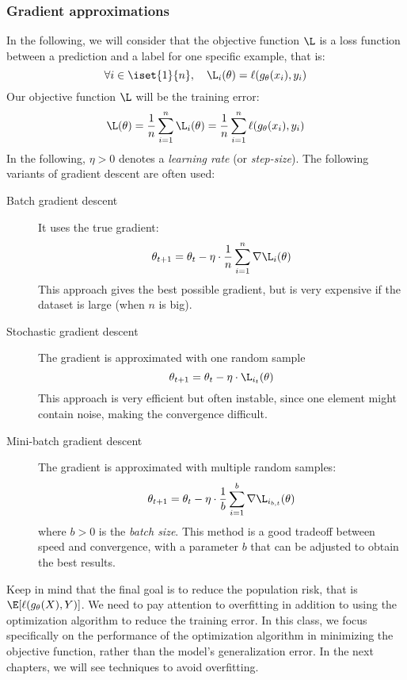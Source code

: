 \subsubsection{Gradient approximations}
In the following, we will consider that the objective function $\L$ is a loss function between a prediction and a label for one specific example, that is:
\begin{equation*}
    \forall i\in\iset{1}{n}, \quad \L_i(\theta) = \ell(g_\theta(x_i),y_i)
\end{equation*}
Our objective function $\L$ will be the training error:
\begin{equation*}
    \L(\theta) = \frac{1}{n}\sum_{i=1}^n \L_i(\theta) =  \frac{1}{n}\sum_{i=1}^n \ell(g_\theta(x_i),y_i)
\end{equation*}
In the following, $\eta>0$ denotes a \emph{learning rate} (or \emph{step-size}). The following variants of gradient descent are often used:
\begin{description}
    \item[Batch gradient descent] It uses the true gradient:
    \begin{equation*}
        \theta_{t+1} = \theta_t-\eta\cdot\frac{1}{n}\sum_{i=1}^n\nabla\L_i(\theta)
    \end{equation*}
    This approach gives the best possible gradient, but is very expensive if the dataset is large (when $n$ is big).
    \item[Stochastic gradient descent] The gradient is approximated with one random sample
    \begin{equation*}
        \theta_{t+1} = \theta_t-\eta\cdot\L_{i_t}(\theta)
    \end{equation*}
    This approach is very efficient but often instable, since one element might contain noise, making the convergence difficult.
    \item[Mini-batch gradient descent] The gradient is approximated with multiple random samples:
    \begin{equation*}
        \theta_{t+1} = \theta_t-\eta\cdot\frac{1}{b}\sum_{i=1}^b\nabla\L_{i_{b,t}}(\theta)
    \end{equation*}
    where $b>0$ is the \emph{batch size}. This method is a good tradeoff between speed and convergence, with a parameter $b$ that can be adjusted to obtain the best results.
\end{description}

Keep in mind that the final goal is to reduce the population risk, that is $\E[\ell(g_\theta(X), Y)]$. We need to pay attention to overfitting in addition to using the optimization algorithm to reduce the training error. In this class, we focus specifically on the performance of the optimization algorithm in minimizing the objective function, rather than the model's generalization error. In the next chapters, we will see techniques to avoid overfitting.

